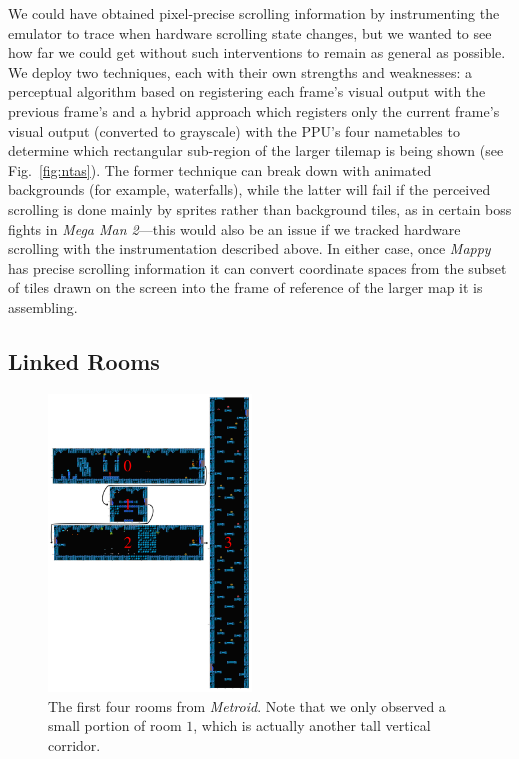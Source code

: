 \documentclass[a4paper]{article}
\begin{document}
We could have obtained pixel-precise scrolling information by instrumenting the emulator to trace when hardware scrolling state changes, but we wanted to see how far we could get without such interventions to remain as general as possible.
We deploy two techniques, each with their own strengths and weaknesses: a perceptual algorithm based on registering each frame's visual output with the previous frame's and a hybrid approach which registers only the current frame's visual output (converted to grayscale) with the PPU's four nametables to determine which rectangular sub-region of the larger tilemap is being shown (see Fig.~\ref{fig:ntas}).
The former technique can break down with animated backgrounds (for example, waterfalls), while the latter will fail if the perceived scrolling is done mainly by sprites rather than background tiles, as in certain boss fights in \emph{Mega Man 2}---this would also be an issue if we tracked hardware scrolling with the instrumentation described above.
In either case, once \emph{Mappy} has precise scrolling information it can convert coordinate spaces from the subset of tiles drawn on the screen into the frame of reference of the larger map it is assembling.

\subsection{Linked Rooms} \label{sec:links}


\begin{figure}
\centering
\includegraphics[width=0.48\textwidth]{figures/Metroid.pdf}

\caption{The first four rooms from \emph{Metroid}.  Note that we only observed a small portion of room $1$, which is actually another tall vertical corridor.}
\label{fig:metroid}
\end{figure}
\end{document}
